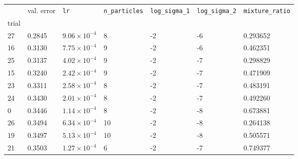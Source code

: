 \begin{tabular}{lp{2.3cm}p{2.3cm}p{2.3cm}p{2.3cm}p{2.3cm}p{2.3cm}}
\toprule
{} &  val. error &         \texttt{lr} &  \texttt{n\_particles} &  \texttt{log\_sigma\_1} &  \texttt{log\_sigma\_2} &  \texttt{mixture\_ratio} \\
trial &             &                     &                        &                         &                         &                          \\
\midrule
27    &      0.2845 & $9.06\times10^{-4}$ &                      8 &                      -2 &                      -6 &                 0.293652 \\
16    &      0.3130 & $7.75\times10^{-4}$ &                      9 &                      -2 &                      -6 &                 0.462351 \\
25    &      0.3137 & $4.02\times10^{-4}$ &                      9 &                      -2 &                      -7 &                 0.298829 \\
15    &      0.3240 & $2.42\times10^{-4}$ &                      9 &                      -2 &                      -7 &                 0.471909 \\
23    &      0.3311 & $2.58\times10^{-4}$ &                      8 &                      -2 &                      -7 &                 0.483191 \\
24    &      0.3430 & $2.01\times10^{-4}$ &                      8 &                      -2 &                      -7 &                 0.492260 \\
0     &      0.3446 & $1.14\times10^{-4}$ &                      8 &                      -2 &                      -8 &                 0.673881 \\
26    &      0.3494 & $6.34\times10^{-4}$ &                     10 &                      -2 &                      -8 &                 0.264138 \\
19    &      0.3497 & $5.13\times10^{-4}$ &                     10 &                      -2 &                      -8 &                 0.505571 \\
21    &      0.3503 & $1.27\times10^{-4}$ &                      6 &                      -2 &                      -7 &                 0.749377 \\
\bottomrule
\end{tabular}
